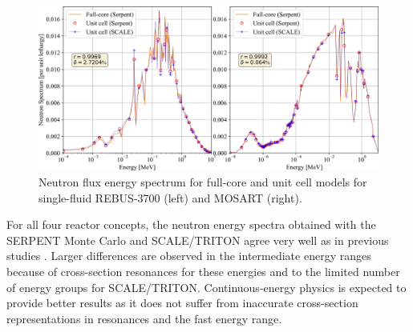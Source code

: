 \documentclass[letterpaper]{mandc2019}
\begin{document}
\begin{figure}[t!]
  \centering
  \includegraphics[width=\textwidth]{./Figures/rebus_mosart_spectrum.png}
  	  \vspace{-0.2in}
  \caption{Neutron flux energy spectrum for full-core and unit cell models for single-fluid REBUS-3700 (left) and \gls{MOSART} (right).}
  \label{fig:spectrum_rebus}
\end{figure}
For all four reactor concepts, the neutron energy spectra obtained with the SERPENT Monte Carlo and SCALE/TRITON agree very well as in previous studies \cite{betzler_fuel_2018}. 
Larger differences are observed in the intermediate energy ranges because of cross-section resonances for these energies and to the limited number of energy groups for SCALE/TRITON. 
Continuous-energy physics is expected to provide better results as it does not suffer from inaccurate cross-section representations in resonances and the fast energy range. 
\end{document}
